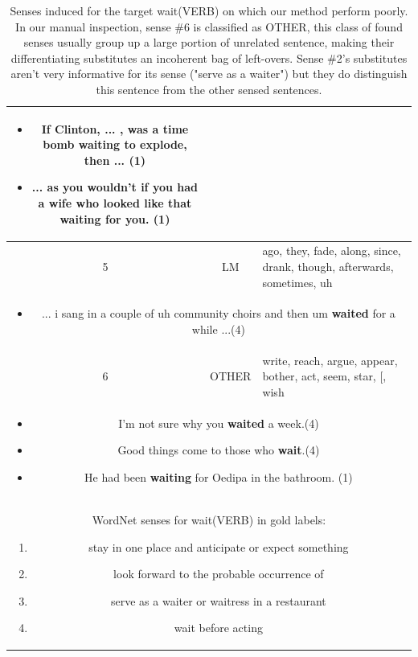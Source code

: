 \documentclass[11pt,a4paper]{article}
\begin{document}
\begin{table}[ht!]
\begin{tabularx}{\linewidth}{| c | c | X  |}
{\begin{itemize}[topsep=0pt,itemsep=0pt,partopsep=0pt, parsep=0pt]
        \item If Clinton, ... , was a time bomb {\bf waiting} to explode, then ... (1)
      \item ... as you wouldn't if you had a wife who looked like that {\bf waiting} for you. (1)
    \end{itemize}
  }\\
  \hline\hline
    5  & LM & ago, they, fade, along, since, drank, though, afterwards, sometimes, uh \\ \hline
    \multicolumn{3}{|p{0.92\linewidth}|}{
    \begin{itemize}[topsep=0pt,itemsep=0pt,partopsep=0pt, parsep=0pt]
        \item ... i sang in a couple of uh community choirs and then um {\bf waited} for a while ...(4)
    \end{itemize}
  }\\
  \hline\hline
  6  & OTHER& write, reach, argue, appear, bother, act, seem, star, [, wish \\ \hline
    \multicolumn{3}{|p{0.92\linewidth}|}{
    \begin{itemize}[topsep=0pt,itemsep=0pt,partopsep=0pt, parsep=0pt]
        \item  I'm not sure why you {\bf waited} a week.(4)
        \item  Good things come to those who {\bf wait}.(4)
        \item  He had been {\bf waiting} for Oedipa in the bathroom. (1)
    \end{itemize}}\\
  \hline\hline
    \multicolumn{3}{|p{0.92\linewidth}|}{
    WordNet senses for wait(VERB) in gold labels:
    \begin{enumerate}
        [topsep=2pt,itemsep=0pt,partopsep=0pt, parsep=0pt]
        \item stay in one place and anticipate or expect something
        \item look forward to the probable occurrence of
        \item serve as a waiter or waitress in a restaurant
        \item wait before acting
    \end{enumerate}}\\
  
  \hline
\end{tabularx}
\caption{Senses induced for the target wait(VERB) on which our method perform poorly. In our manual inspection, sense \#6 is classified as OTHER, this class of found senses usually group up a large portion of unrelated sentence, making their differentiating substitutes an incoherent bag of left-overs. Sense \#2's substitutes aren't very informative for its sense ("serve as a waiter") but they do distinguish this sentence from the other sensed sentences.}
  \label{tab:examples2}
\end{table}
\end{document}
